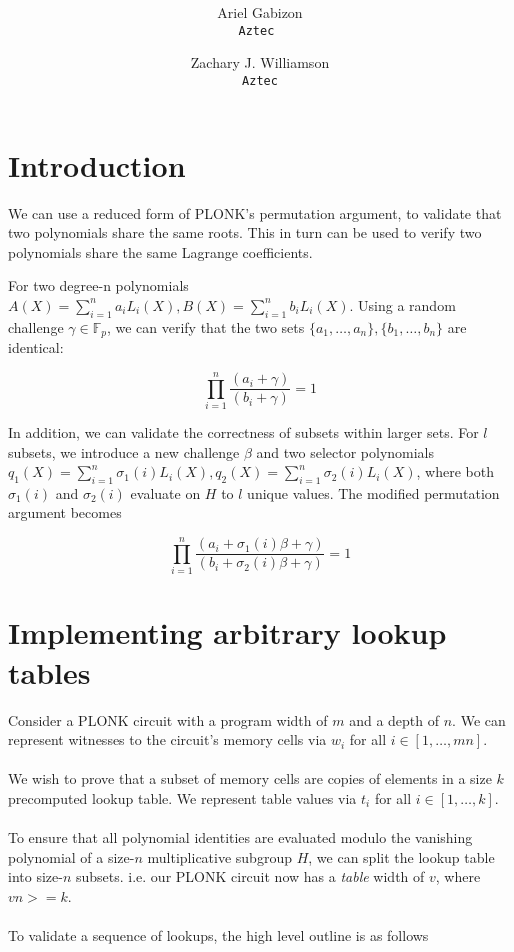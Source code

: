 \documentclass[11pt]{article} %
\title{ \bf \papertitle \\[0.72cm]}
\author{ Ariel Gabizon\\ \tt{Aztec}  \and Zachary J. Williamson\\ \tt{Aztec}}
\newcommand{\F}{\ensuremath{\mathbb F}\xspace}
\begin{document}
    \maketitle


\section{Introduction}


We can use a reduced form of PLONK's permutation argument, to validate that two polynomials share the same roots. This in turn can be used to verify two polynomials share the same Lagrange coefficients. 

For two degree-n polynomials $A(X) = \sum_{i=1}^n a_iL_i(X), B(X) = \sum_{i=1}^n b_iL_i(X)$. Using a random challenge $\gamma \in \F_p$, we can verify that the two sets $\{a_1, \ldots, a_n \}, \{b_1, \ldots, b_n\}$ are identical:

$$ \prod_{i=1}^n \frac{(a_i + \gamma)}{(b_i + \gamma)} = 1$$

In addition, we can validate the correctness of subsets within larger sets. For $l$ subsets, we introduce a new challenge $\beta$ and two selector polynomials $q_1(X) = \sum_{i=1}^n \sigma_{1}(i)L_i(X), q_2(X) = \sum_{i=1}^n \sigma_{2}(i)L_i(X)$, where both $\sigma_{1}(i)$ and $\sigma_2(i)$ evaluate on $H$ to $l$ unique values. The modified permutation argument becomes

$$
\prod_{i=1}^n \frac{(a_i + \sigma_1(i)\beta + \gamma)}{(b_i + \sigma_2(i)\beta + \gamma)} = 1
$$

\section{Implementing arbitrary lookup tables}

Consider a PLONK circuit with a program width of $m$ and a depth of $n$. We can represent witnesses to the circuit's memory cells via $w_i$ for all $i \in [1, \ldots, mn]$.
\\
\\
We wish to prove that a subset of memory cells are copies of elements in a size $k$ precomputed lookup table. We represent table values via $t_i$ for all $i \in [1, \ldots, k]$.
\\
\\
To ensure that all polynomial identities are evaluated modulo the vanishing polynomial of a size-$n$ multiplicative subgroup $H$, we can split the lookup table into size-$n$ subsets. i.e. our PLONK circuit now has a \textit{table} width of $v$, where $vn >= k$.
\\
\\
To validate a sequence of lookups, the high level outline is as follows
\end{document}
